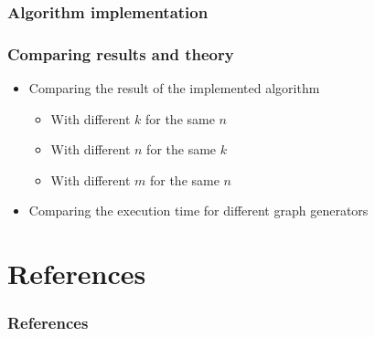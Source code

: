\documentclass[xcolor=dvipsnames]{beamer}
\begin{document}
\begin{frame}
  \frametitle{Algorithm implementation}
\end{frame}

\begin{frame}
  \frametitle{Comparing results and theory}
  \begin{itemize}
  \item Comparing the result of the implemented algorithm
    \begin{itemize}
    \item With different $k$ for the same $n$
    \item With different $n$ for the same $k$
    \item With different $m$ for the same $n$
    \end{itemize}
  \item Comparing the execution time for different graph generators
  \end{itemize}
\end{frame}

\section*{References}
\begin{frame}[allowframebreaks]
  \frametitle{References}
  

  
\end{frame}
\end{document}

